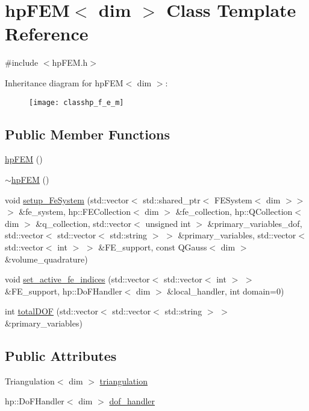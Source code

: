 \section{hp\-F\-E\-M$<$ dim $>$ Class Template Reference}
\label{classhp_f_e_m}


{\ttfamily \#include $<$hp\-F\-E\-M.\-h$>$}

Inheritance diagram for hp\-F\-E\-M$<$ dim $>$\-:\begin{figure}[H]
\begin{center}
\leavevmode
\texttt{[image: classhp\_f\_e\_m]}
\end{center}
\end{figure}
\subsection*{Public Member Functions}
\begin{DoxyCompactItemize}
\item 
\hyperlink{classhp_f_e_m_ac1540fdd371c0b89a90809251b618025}{hp\-F\-E\-M} ()
\item 
\hyperlink{classhp_f_e_m_acf426058508649734ee9618b5c9148c1}{$\sim$hp\-F\-E\-M} ()
\item 
void \hyperlink{classhp_f_e_m_afe86b756fb757221f5a8a16c956b7e76}{setup\-\_\-\-Fe\-System} (std\-::vector$<$ std\-::shared\-\_\-ptr$<$ F\-E\-System$<$ dim $>$$>$ $>$ \&fe\-\_\-system, hp\-::\-F\-E\-Collection$<$ dim $>$ \&fe\-\_\-collection, hp\-::\-Q\-Collection$<$ dim $>$ \&q\-\_\-collection, std\-::vector$<$ unsigned int $>$ \&primary\-\_\-variables\-\_\-dof, std\-::vector$<$ std\-::vector$<$ std\-::string $>$ $>$ \&primary\-\_\-variables, std\-::vector$<$ std\-::vector$<$ int $>$ $>$ \&F\-E\-\_\-support, const Q\-Gauss$<$ dim $>$ \&volume\-\_\-quadrature)
\item 
void \hyperlink{classhp_f_e_m_a12205240784051ad249a536cb7ee98d5}{set\-\_\-active\-\_\-fe\-\_\-indices} (std\-::vector$<$ std\-::vector$<$ int $>$ $>$ \&F\-E\-\_\-support, hp\-::\-Do\-F\-Handler$<$ dim $>$ \&local\-\_\-handler, int domain=0)
\item 
int \hyperlink{classhp_f_e_m_a9ceee3881af75e3be863fdb2d1688c0e}{total\-D\-O\-F} (std\-::vector$<$ std\-::vector$<$ std\-::string $>$ $>$ \&primary\-\_\-variables)
\end{DoxyCompactItemize}
\subsection*{Public Attributes}
\begin{DoxyCompactItemize}
\item 
Triangulation$<$ dim $>$ \hyperlink{classhp_f_e_m_a1e604d1e68926caf1ebc67d2a7451783}{triangulation}
\item 
hp\-::\-Do\-F\-Handler$<$ dim $>$ \hyperlink{classhp_f_e_m_ab4df20fb431f370878adc06e19280d62}{dof\-\_\-handler}
\end{DoxyCompactItemize}


